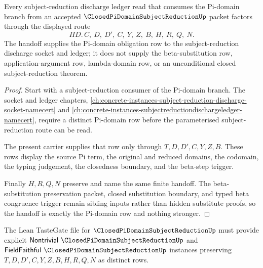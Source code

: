 \begin{theorem}
\label{thm:closed-pi-domain-subject-reduction-handoff}
Every subject-reduction discharge ledger read that consumes the Pi-domain branch from an accepted $\ClosedPiDomainSubjectReductionUp$ packet factors through the displayed route
$$
\Pi D.\,C,\ D,\ D',\ C,\ Y,\ Z,\ B,\ H,\ R,\ Q,\ N .
$$
The handoff supplies the Pi-domain obligation row to the subject-reduction discharge socket and ledger; it does not supply the beta-substitution row, application-argument row, lambda-domain row, or an unconditional closed subject-reduction theorem.
\end{theorem}
\begin{proof}
Start with a subject-reduction consumer of the Pi-domain branch. The socket and ledger chapters, \autoref{ch:concrete-instances-subject-reduction-discharge-socket-namecert} and \autoref{ch:concrete-instances-subjectreductiondischargeledger-namecert}, require a distinct Pi-domain row before the parameterised subject-reduction route can be read.

The present carrier supplies that row only through $T,D,D',C,Y,Z,B$. These rows display the source Pi term, the original and reduced domains, the codomain, the typing judgement, the closedness boundary, and the beta-step trigger.

Finally $H,R,Q,N$ preserve and name the same finite handoff. The beta-substitution preservation packet, closed substitution boundary, and typed beta congruence trigger remain sibling inputs rather than hidden substitute proofs, so the handoff is exactly the Pi-domain row and nothing stronger.
\end{proof}



The Lean TasteGate file for $\ClosedPiDomainSubjectReductionUp$ must provide explicit $\mathsf{Nontrivial}\ \ClosedPiDomainSubjectReductionUp$ and $\mathsf{FieldFaithful}\ \ClosedPiDomainSubjectReductionUp$ instances preserving $T,D,D',C,Y,Z,B,H,R,Q,N$ as distinct rows.

